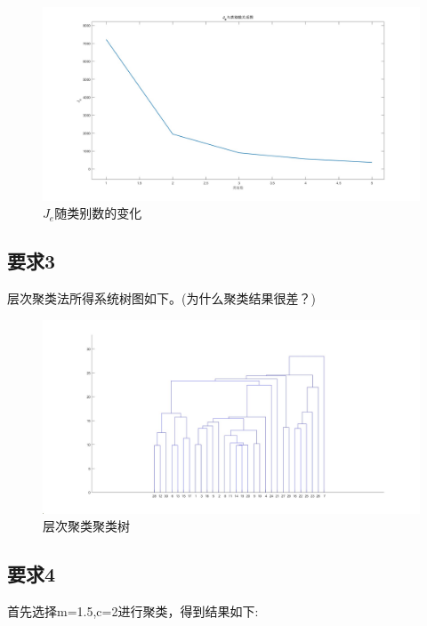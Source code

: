 \documentclass{article}
\begin{document}
\begin{figure}[H]
    \centering
    \includegraphics[width=1\textwidth]{image/Figure08.jpg}
    \caption{$J_e$随类别数的变化}
    \label{Figure08}
\end{figure}

\subsection{要求3}
层次聚类法所得系统树图如下。(为什么聚类结果很差？)

\begin{figure}[H]
    \centering
    \includegraphics[width=1\textwidth]{image/Figure09.jpg}
    \caption{层次聚类聚类树}
    \label{Figure09}
\end{figure}

\subsection{要求4}
首先选择m=1.5,c=2进行聚类，得到结果如下:
\end{document}
